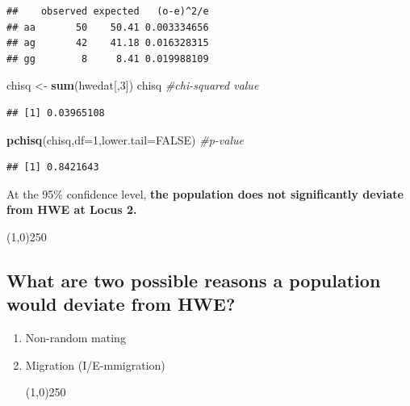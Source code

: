 \documentclass[]{article}
\newenvironment{Shaded}{\begin{snugshade}}{\end{snugshade}}
\newcommand{\KeywordTok}[1]{\textcolor[rgb]{0.13,0.29,0.53}{\textbf{{#1}}}}
\newcommand{\DataTypeTok}[1]{\textcolor[rgb]{0.13,0.29,0.53}{{#1}}}
\newcommand{\DecValTok}[1]{\textcolor[rgb]{0.00,0.00,0.81}{{#1}}}
\newcommand{\StringTok}[1]{\textcolor[rgb]{0.31,0.60,0.02}{{#1}}}
\newcommand{\CommentTok}[1]{\textcolor[rgb]{0.56,0.35,0.01}{\textit{{#1}}}}
\newcommand{\OtherTok}[1]{\textcolor[rgb]{0.56,0.35,0.01}{{#1}}}
\newcommand{\NormalTok}[1]{{#1}}
\begin{document}
\begin{verbatim}
##    observed expected   (o-e)^2/e
## aa       50    50.41 0.003334656
## ag       42    41.18 0.016328315
## gg        8     8.41 0.019988109
\end{verbatim}

\begin{Shaded}
\begin{Highlighting}[]
\NormalTok{chisq <-}\StringTok{ }\KeywordTok{sum}\NormalTok{(hwedat[,}\DecValTok{3}\NormalTok{])}
\NormalTok{chisq                               }\CommentTok{#chi-squared value}
\end{Highlighting}
\end{Shaded}

\begin{verbatim}
## [1] 0.03965108
\end{verbatim}

\begin{Shaded}
\begin{Highlighting}[]
\KeywordTok{pchisq}\NormalTok{(chisq,}\DataTypeTok{df=}\DecValTok{1}\NormalTok{,}\DataTypeTok{lower.tail=}\OtherTok{FALSE}\NormalTok{) }\CommentTok{#p-value}
\end{Highlighting}
\end{Shaded}

\begin{verbatim}
## [1] 0.8421643
\end{verbatim}

At the 95\% confidence level, \textbf{the population does not
significantly deviate from HWE at Locus 2.}

\begin{center}
\line(1,0){250}
\end{center}

\subsection{What are two possible reasons a population would deviate
from
HWE?}\label{what-are-two-possible-reasons-a-population-would-deviate-from-hwe}

\begin{enumerate}
\def\labelenumi{(\arabic{enumi})}
\itemsep1pt\parskip0pt
\item
  Non-random mating
\item
  Migration (I/E-mmigration)

  \begin{center}
  \line(1,0){250}
  \end{center}
\end{enumerate}
\end{document}
